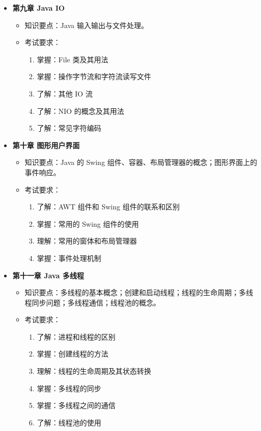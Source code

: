 \documentclass{../note}
\begin{document}
\begin{itemize}
  \item \textbf{第九章 Java IO}
    \begin{itemize}
      \item 知识要点：Java 输入输出与文件处理。
      \item 考试要求：
        \begin{enumerate}
          \item 掌握：File 类及其用法
          \item 掌握：操作字节流和字符流读写文件
          \item 了解：其他 IO 流
          \item 了解：NIO 的概念及其用法
          \item 了解：常见字符编码
        \end{enumerate}
    \end{itemize}

  \item \textbf{第十章 图形用户界面}
    \begin{itemize}
      \item 知识要点：Java 的 Swing 组件、容器、布局管理器的概念；图形界面上的事件响应。
      \item 考试要求：
        \begin{enumerate}
          \item 了解：AWT 组件和 Swing 组件的联系和区别
          \item 掌握：常用的 Swing 组件的使用
          \item 理解：常用的窗体和布局管理器
          \item 掌握：事件处理机制
        \end{enumerate}
    \end{itemize}

  \item \textbf{第十一章 Java 多线程}
    \begin{itemize}
      \item 知识要点：多线程的基本概念；创建和启动线程；线程的生命周期；多线程同步问题；多线程通信；线程池的概念。
      \item 考试要求：
        \begin{enumerate}
          \item 了解：进程和线程的区别
          \item 掌握：创建线程的方法
          \item 理解：线程的生命周期及其状态转换
          \item 掌握：多线程的同步
          \item 掌握：多线程之间的通信
          \item 了解：线程池的使用
        \end{enumerate}
    \end{itemize}


\end{itemize}
\end{document}
